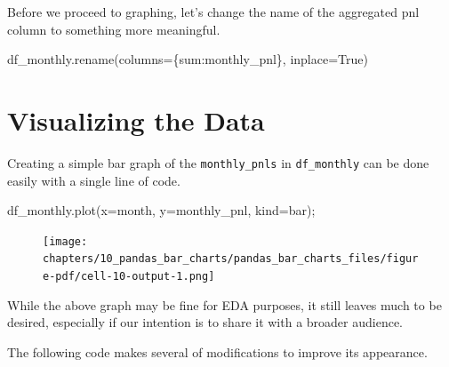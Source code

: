 \documentclass[
  letterpaper,
  DIV=11,
  numbers=noendperiod]{scrreprt}
\newenvironment{Shaded}{\begin{snugshade}}{\end{snugshade}}
\newcommand{\NormalTok}[1]{\textcolor[rgb]{0.00,0.23,0.31}{#1}}
\newcommand{\OperatorTok}[1]{\textcolor[rgb]{0.37,0.37,0.37}{#1}}
\newcommand{\StringTok}[1]{\textcolor[rgb]{0.13,0.47,0.30}{#1}}
\newcommand{\VariableTok}[1]{\textcolor[rgb]{0.07,0.07,0.07}{#1}}
\begin{document}
Before we proceed to graphing, let's change the name of the aggregated
pnl column to something more meaningful.

\begin{Shaded}
\begin{Highlighting}[]
\NormalTok{df\_monthly.rename(columns}\OperatorTok{=}\NormalTok{\{}\StringTok{\textquotesingle{}sum\textquotesingle{}}\NormalTok{:}\StringTok{\textquotesingle{}monthly\_pnl\textquotesingle{}}\NormalTok{\}, inplace}\OperatorTok{=}\VariableTok{True}\NormalTok{)}
\end{Highlighting}
\end{Shaded}

\hypertarget{visualizing-the-data}{%
\section{Visualizing the Data}\label{visualizing-the-data}}

Creating a simple bar graph of the \texttt{monthly\_pnls} in
\texttt{df\_monthly} can be done easily with a single line of code.

\begin{Shaded}
\begin{Highlighting}[]
\NormalTok{df\_monthly.plot(x}\OperatorTok{=}\StringTok{\textquotesingle{}month\textquotesingle{}}\NormalTok{, y}\OperatorTok{=}\StringTok{\textquotesingle{}monthly\_pnl\textquotesingle{}}\NormalTok{, kind}\OperatorTok{=}\StringTok{\textquotesingle{}bar\textquotesingle{}}\NormalTok{)}\OperatorTok{;}
\end{Highlighting}
\end{Shaded}

\begin{figure}[H]

{\centering \texttt{[image: chapters/10\_pandas\_bar\_charts/pandas\_bar\_charts\_files/figure-pdf/cell-10-output-1.png]}

}

\end{figure}

While the above graph may be fine for EDA purposes, it still leaves much
to be desired, especially if our intention is to share it with a broader
audience.

The following code makes several of modifications to improve its
appearance.
\end{document}
